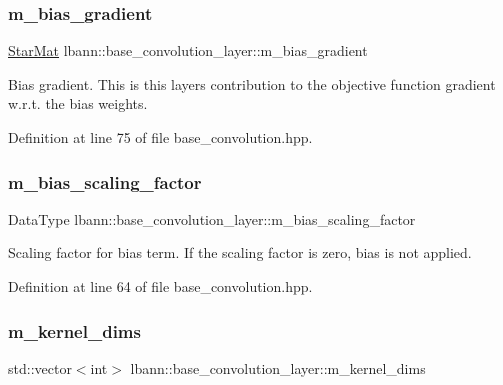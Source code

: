 \subsubsection{\texorpdfstring{m\+\_\+bias\+\_\+gradient}{m\_bias\_gradient}}
{\footnotesize\ttfamily \hyperlink{base_8hpp_aba08580d21767b53d0737e115d738dbe}{Star\+Mat} lbann\+::base\+\_\+convolution\+\_\+layer\+::m\+\_\+bias\+\_\+gradient\hspace{0.3cm}{\ttfamily [protected]}}

Bias gradient. This is this layer\textquotesingle{}s contribution to the objective function gradient w.\+r.\+t. the bias weights. 

Definition at line 75 of file base\+\_\+convolution.\+hpp.

\mbox{\label{classlbann_1_1base__convolution__layer_a5abe0bcd128b66a41fa481b28a9c2104}} 
\subsubsection{\texorpdfstring{m\+\_\+bias\+\_\+scaling\+\_\+factor}{m\_bias\_scaling\_factor}}
{\footnotesize\ttfamily Data\+Type lbann\+::base\+\_\+convolution\+\_\+layer\+::m\+\_\+bias\+\_\+scaling\+\_\+factor\hspace{0.3cm}{\ttfamily [protected]}}

Scaling factor for bias term. If the scaling factor is zero, bias is not applied. 

Definition at line 64 of file base\+\_\+convolution.\+hpp.

\mbox{\label{classlbann_1_1base__convolution__layer_a283edb6a476f975e713d0b4235ac658f}} 
\subsubsection{\texorpdfstring{m\+\_\+kernel\+\_\+dims}{m\_kernel\_dims}}
{\footnotesize\ttfamily std\+::vector$<$int$>$ lbann\+::base\+\_\+convolution\+\_\+layer\+::m\+\_\+kernel\+\_\+dims\hspace{0.3cm}{\ttfamily [protected]}}

